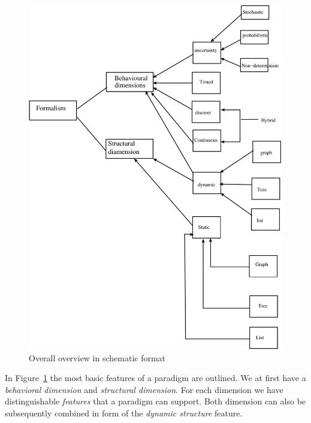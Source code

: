 \documentclass[a4paper,8pt]{article}
\begin{document}
\begin{figure}[h]
\centering
\begin{center}
 \includegraphics[scale=0.25]{overview}
\caption{Overall overview in schematic format}
\label{fig:arch}
\end{center}
\end{figure}
%  
In Figure~\ref{fig:arch} the most basic features of a paradigm are outlined. We at first have a \emph{behavioral dimension} and \emph{structural dimension}. For each dimension we have distinguishable \emph{features} that a paradigm can support. Both dimension can also be subsequently combined in form of the \emph{dynamic structure} feature. 
\end{document}
